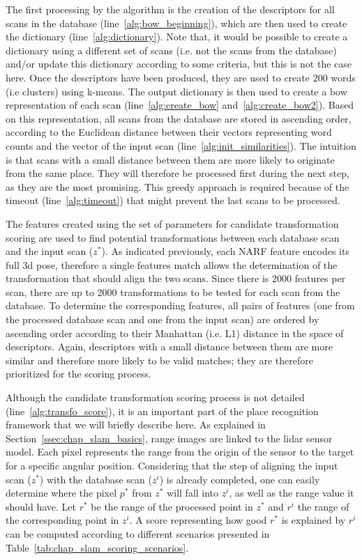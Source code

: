 The first processing by the algorithm is the creation of the descriptors for all scans in the database (line~\ref{alg:bow_beginning}), which are then used to create the dictionary (line~\ref{alg:dictionary}). Note that, it would be possible to create a dictionary using a different set of scans (i.e. not the scans from the database) and/or update this dictionary according to some criteria, but this is not the case here. Once the descriptors have been produced, they are used to create 200 words (i.e clusters) using k-means. The output dictionary is then used to create a \gls*{bow} representation of each scan (line~\ref{alg:create_bow} and~\ref{alg:create_bow2}). Based on this representation, all scans from the database are stored in ascending order, according to the Euclidean distance between their vectors representing word counts and the vector of the input scan (line~\ref{alg:init_similarities}). The intuition is that scans with a small distance between them are more likely to originate from the same place. They will therefore be processed first during the next step, as they are the most promising. This greedy approach is required because of the timeout (line~\ref{alg:timeout}) that might prevent the last scans to be processed.

The features created using the set of parameters for candidate transformation scoring are used to find potential transformations between each database scan and the input scan ($z^*$). As indicated previously, each NARF feature encodes its full \gls*{3d} pose, therefore a single features match allows the determination of the transformation that should align the two scans. Since there is 2000 features per scan, there are up to 2000 transformations to be tested for each scan from the database. To determine the corresponding features, all pairs of features (one from the processed database scan and one from the input scan) are ordered by ascending order according to their Manhattan (i.e. L1) distance in the space of descriptors. Again, descriptors with a small distance between them are more similar and therefore more likely to be valid matches; they are therefore prioritized for the scoring process.

Although the candidate transformation scoring process is not detailed (line~\ref{alg:transfo_score}), it is an important part of the place recognition framework that we will briefly describe here. As explained in Section~\ref{ssec:chap_slam_basics}, range images are linked to the \gls*{lidar} sensor model. Each pixel represents the range from the origin of the sensor to the target for a specific angular position. Considering that the step of aligning the input scan ($z^*$) with the database scan ($z^i$) is already completed, one can easily determine where the pixel $p^*$ from $z^*$ will fall into $z^i$, as well as the range value it should have. Let $r^*$ be the range of the processed point in $z^*$ and $r^i$ the range of the corresponding point in $z^i$. A score representing how good $r^*$ is explained by $r^i$ can be computed according to different scenarios presented in Table~\ref{tab:chap_slam_scoring_scenarios}.

